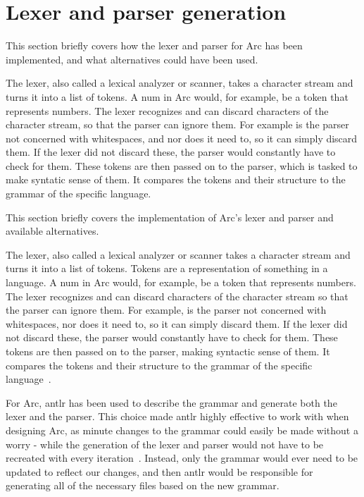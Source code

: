 \section{Lexer and parser generation}\label{sec:lexerandparsergen}
This section briefly covers how the lexer and parser for Arc has been implemented, and what alternatives could have been used.

The lexer, also called a lexical analyzer or scanner, takes a character stream and turns it into a list of tokens. A num in Arc would, for example, be a token that represents numbers. The lexer recognizes and can discard characters of the character stream, so that the parser can ignore them. For example is the parser not concerned with whitespaces, and nor does it need to, so it can simply discard them. If the lexer did not discard these, the parser would constantly have to check for them. These tokens are then passed on to the parser, which is tasked to make syntatic sense of them. It compares the tokens and their structure to the grammar of the specific language.

This section briefly covers the implementation of Arc's lexer and parser and available alternatives.

The lexer, also called a lexical analyzer or scanner takes a character stream and turns it into a list of tokens. Tokens are a representation of something in a language. A num in Arc would, for example, be a token that represents numbers. The lexer recognizes and can discard characters of the character stream so that the parser can ignore them. For example, is the parser not concerned with whitespaces, nor does it need to, so it can simply discard them. If the lexer did not discard these, the parser would constantly have to check for them. These tokens are then passed on to the parser, making syntactic sense of them. It compares the tokens and their structure to the grammar of the specific language~\cite{Parr2014}.

For Arc, \gls{antlr} has been used to describe the grammar and generate both the lexer and the parser. This choice made \gls{antlr} highly effective to work with when designing Arc, as minute changes to the grammar could easily be made without a worry - while the generation of the lexer and parser would not have to be recreated with every iteration~\cite{Parr2014}. Instead, only the grammar would ever need to be updated to reflect our changes, and then \gls{antlr}  would be responsible for generating all of the necessary files based on the new grammar.


